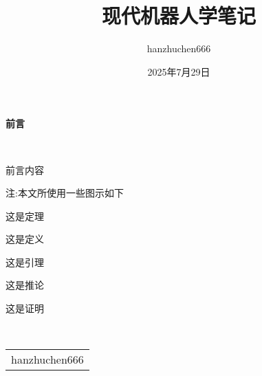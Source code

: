\documentclass[12pt, a4paper, oneside]{ctexbook}
\title{{\Huge{\textbf{现代机器人学笔记}}}}
\author{hanzhuchen666}
\date{2025年7月29日}
\begin{document}
\maketitle

\setcounter{page}{1}

\begin{center}
    \Huge\textbf{前言}
\end{center}~\

前言内容

注:本文所使用一些图示如下

\begin{theorembox}
这是定理
\end{theorembox}

\begin{definitionbox}
这是定义
\end{definitionbox}

\begin{lemmabox}
这是引理
\end{lemmabox}

\begin{corollarybox}
这是推论
\end{corollarybox}

\begin{proofbox}
这是证明
\end{proofbox}
~\\
\begin{flushright}
    \begin{tabular}{c}
        hanzhuchen666\\
        
    \end{tabular}
\end{flushright}

\newpage
{}
\setcounter{page}{1}
\tableofcontents
\newpage
\setcounter{page}{1}




\end{document}
